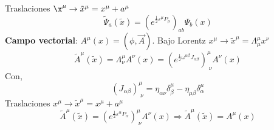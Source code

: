 \documentclass[../main.tex]{subfiles}
\begin{document}
 Traslaciones $\x^\mu \rightarrow \tilde{x}^\mu = x^\mu + a^\mu$
 \begin{equation*}
   \tilde{\Psi}_a(\tilde{x}) = \left( e^{\frac{1}{2}\varepsilon^\mu P_\mu} \right)_{ab} \Psi_b(x)
 \end{equation*}
\textbf{Campo vectorial}: $A^\mu(x) = \left( \phi,\vec{A} \right)$. Bajo Lorentz $x^\mu \rightarrow \tilde{x}^\mu = \Lambda^\mu_\mu x^\nu$
\begin{equation*}
  \tilde{{A}}^\mu (\tilde{x}) = \Lambda^\mu_\nu A^\nu(x) = \left( e^{\frac{1}{2}\omega^{\alpha \beta}J_{\alpha \beta}} \right)^\mu_{\; \nu} A^\nu(x)
\end{equation*}
Con,
\begin{equation*}
   \left( J_{\alpha \beta} \right)^\mu_{\; \nu} = \eta_{\alpha \nu} \delta^\mu_\beta - \eta_{\mu \beta}\delta^\mu_\alpha
\end{equation*}
Traslaciones $x^\mu \rightarrow \tilde{x}^\mu = x^\mu + a^\mu$
\begin{equation*}
      \tilde{{A}}^\mu(\tilde{x}) = \left( e^{\frac{1}{2}\varepsilon^\alpha P_\alpha} \right)^\mu_{\;\nu} A^\nu(x) \Rightarrow \tilde{{A}}^\mu(\tilde{x}) = A^\mu(x)
\end{equation*}
\end{document}

